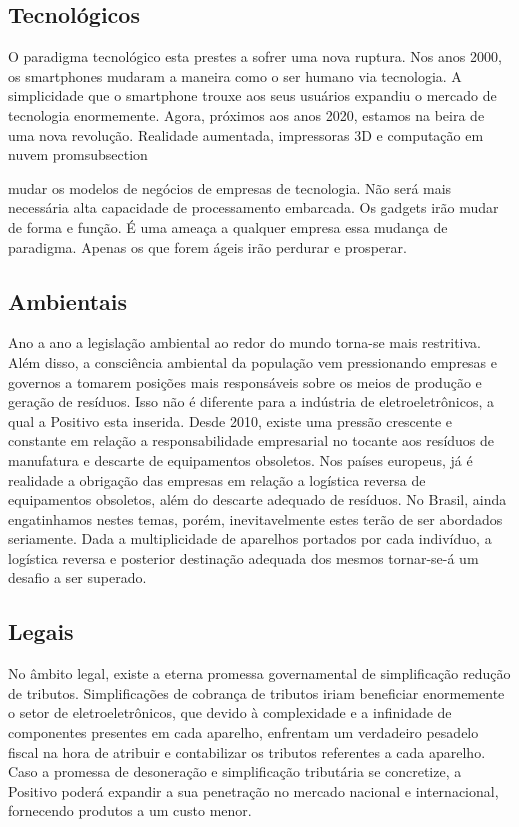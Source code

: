 {{{\subsection{Tecnológicos}
O paradigma tecnológico esta prestes a sofrer uma nova ruptura. Nos anos 2000, os smartphones mudaram a maneira como o ser humano via tecnologia. A simplicidade que o smartphone trouxe aos seus usuários expandiu o mercado de tecnologia enormemente. Agora, próximos aos anos 2020, estamos na beira de uma nova revolução. Realidade aumentada, impressoras 3D e computação em nuvem promsubsection{ mudar os modelos de negócios de empresas de tecnologia. Não será mais necessária alta capacidade de processamento embarcada. Os gadgets irão mudar de forma e função. É uma ameaça a qualquer empresa essa mudança de paradigma. Apenas os que forem ágeis irão perdurar e prosperar.

\subsection{Ambientais}
Ano a ano a legislação ambiental ao redor do mundo torna-se mais restritiva. Além disso, a consciência ambiental da população vem pressionando empresas e governos a tomarem posições mais responsáveis sobre os meios de produção e geração de resíduos. Isso não é diferente para a indústria de eletroeletrônicos, a qual a Positivo esta inserida. Desde 2010, existe uma pressão crescente e constante em relação a responsabilidade empresarial no tocante aos resíduos de manufatura e descarte de equipamentos obsoletos. Nos países europeus, já é realidade a obrigação das empresas em relação a logística reversa de equipamentos obsoletos, além do descarte adequado de resíduos. No Brasil, ainda engatinhamos nestes temas, porém, inevitavelmente estes terão de ser abordados seriamente. Dada a multiplicidade de aparelhos portados por cada indivíduo, a logística reversa e posterior destinação adequada dos mesmos tornar-se-á um desafio a ser superado.

\subsection{Legais}
No âmbito legal, existe a eterna promessa governamental de simplificação redução de tributos. Simplificações de cobrança de tributos iriam beneficiar enormemente o setor de eletroeletrônicos, que devido à complexidade e a infinidade de componentes presentes em cada aparelho, enfrentam um verdadeiro pesadelo fiscal na hora de atribuir e contabilizar os tributos referentes a cada aparelho. Caso a promessa de desoneração e simplificação tributária se concretize, a Positivo poderá expandir a sua penetração no mercado nacional e internacional, fornecendo produtos a um custo menor.

}}}}

